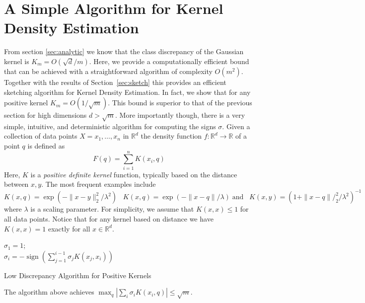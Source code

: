 \documentclass[anon,12pt]{colt2019} %
\newcommand{\R}{\mathbb{R}}
\begin{document}
\section{A Simple Algorithm for Kernel Density Estimation}
From section \ref{sec:analytic} we know that the class discrepancy of the Gaussian kernel is $K_m = O(\sqrt{d}/m)$. 
Here, we provide a computationally efficient bound that can be achieved with a straightforward algorithm of complexity $O(m^2)$. Together with the results of Section~\ref{sec:sketch} this provides an efficient sketching algorithm for Kernel Density Estimation. 
In fact, we show that for any positive kernel $K_m = O(1/\sqrt{m})$. This bound is superior to that of the previous section for high dimensions $d > \sqrt{m}$. More importantly though, there is a very simple, intuitive, and deterministic algorithm for computing the signs $\sigma$. 
Given a collection of data points $X = x_1,\ldots, x_n$ in $\R^d$ the density function $f: \R^d \rightarrow \R$ of a point $q$ is defined as 
$$ F(q) = \sum_{i=1}^{n} K(x_i,q) $$
Here, $K$ is a \emph{positive definite kernel} function, typically based on the distance between $x,y$. The most frequent examples include
$$ K(x,q) = \exp(- \|x-y\|_2^2/\lambda^2)\;\;\; K(x,q) = \exp(- \|x-q\|/\lambda) \; \mbox{and}\;\;\; K(x,y) = (1+\|x-q\|/_2^2/\lambda^2)^{-1}$$
where $\lambda$ is a scaling parameter. For simplicity, we assume that $K(x,x) \leq 1$ for all data points. Notice that for any kernel based on distance we have $K(x,x)=1$ exactly for all $x \in \R^d$.

\begin{algorithm}[H]
 \KwData{Kernel function $K:(\R^d,\R^d)\rightarrow[0,1]$, points  $x_1,\ldots,x_m$}
 $\sigma_1 = 1$;\\
 {$\sigma_i = -\operatorname{sign} (\sum_{j=1}^{i-1}\sigma_j  K(x_j, x_i))$}
\caption{Low Discrepancy Algorithm for Positive Kernels}
\end{algorithm}


\begin{theorem} \label{thm:disc simple kernel}
The algorithm above achieves $\max_q |\sum_i \sigma_i K(x_i,q) | \le \sqrt{m}$.
\end{theorem}
\end{document}

